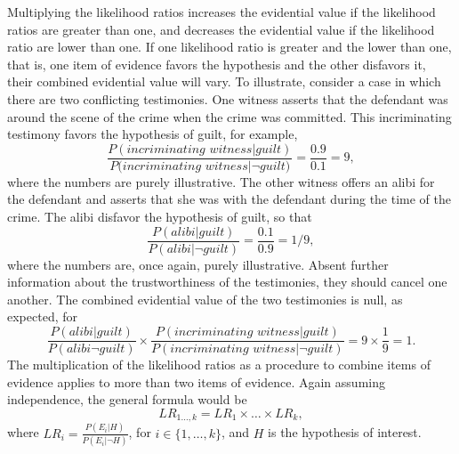 \documentclass[10pt]{article}
\begin{document}
Multiplying the likelihood ratios increases the evidential 
value if the likelihood ratios are greater than one, and decreases the evidential value if the likelihood ratio 
are lower than one. If one likelihood ratio is greater and the lower than one, that is, 
one item of evidence favors the hypothesis and the other disfavors it, 
their combined evidential value will vary.  To illustrate, consider a case in which 
there are two conflicting testimonies. 
One witness asserts that the defendant was around the scene of the 
crime when the crime was committed. This incriminating testimony 
favors the hypothesis of guilt, for example,
%
\[\frac{P(\textit{incriminating witness}| \textit{guilt})}{P(\textit{incriminating witness} | \neg \textit{guilt)}}=\frac{0.9}{0.1}=9,\]
%
where the numbers are purely illustrative. 
The other witness offers an alibi for the defendant and asserts that she was with the defendant 
during the time of the crime. The alibi disfavor the hypothesis of guilt, so that 
%
\[\frac{P(\textit{alibi}| \textit{guilt})}{P(\textit{alibi}| \neg \textit{guilt})}=\frac{0.1}{0.9}=1/9,\] 
%
where the numbers are, once again, purely illustrative. 
Absent further information about the trustworthiness of the testimonies, 
they should cancel one another. 
%
%
The combined evidential value of the two testimonies is null, as expected, for
%
\[\frac{P(\textit{alibi}|  \textit{guilt})}{P(\textit{alibi}  \neg \textit{guilt})}\times \frac{P(\textit{incriminating witness}| \textit{guilt} )}{P(\textit{incriminating witness}| \neg\textit{guilt})}=9\times \frac{1}{9}=1.\] 
%
The multiplication of the likelihood ratios as a procedure to combine items of evidence 
applies to more than two items of evidence. 
Again assuming independence, the general 
formula would be
%
\[LR_{1 \dots ,k}=LR_1\times \dots \times LR_k,\]
%
where $LR_i=\frac{P(E_i | H)}{P(E_i | \neg H)}$, for $i\in \{1, \dots, k\}$, and $H$ is the hypothesis of interest.
\end{document}
